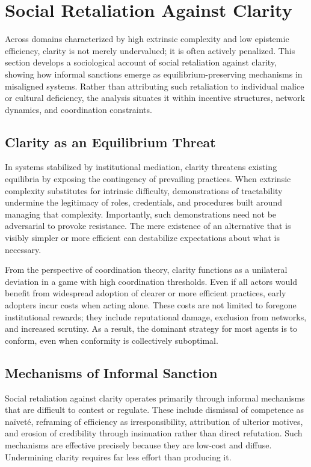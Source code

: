 \documentclass[11pt]{article}
\begin{document}
\section{Social Retaliation Against Clarity}

Across domains characterized by high extrinsic complexity and low epistemic efficiency, clarity is not merely undervalued; it is often actively penalized. This section develops a sociological account of social retaliation against clarity, showing how informal sanctions emerge as equilibrium-preserving mechanisms in misaligned systems. Rather than attributing such retaliation to individual malice or cultural deficiency, the analysis situates it within incentive structures, network dynamics, and coordination constraints.

\subsection{Clarity as an Equilibrium Threat}

In systems stabilized by institutional mediation, clarity threatens existing equilibria by exposing the contingency of prevailing practices. When extrinsic complexity substitutes for intrinsic difficulty, demonstrations of tractability undermine the legitimacy of roles, credentials, and procedures built around managing that complexity. Importantly, such demonstrations need not be adversarial to provoke resistance. The mere existence of an alternative that is visibly simpler or more efficient can destabilize expectations about what is necessary.

From the perspective of coordination theory, clarity functions as a unilateral deviation in a game with high coordination thresholds. Even if all actors would benefit from widespread adoption of clearer or more efficient practices, early adopters incur costs when acting alone. These costs are not limited to foregone institutional rewards; they include reputational damage, exclusion from networks, and increased scrutiny. As a result, the dominant strategy for most agents is to conform, even when conformity is collectively suboptimal.

\subsection{Mechanisms of Informal Sanction}

Social retaliation against clarity operates primarily through informal mechanisms that are difficult to contest or regulate. These include dismissal of competence as naïveté, reframing of efficiency as irresponsibility, attribution of ulterior motives, and erosion of credibility through insinuation rather than direct refutation. Such mechanisms are effective precisely because they are low-cost and diffuse. Undermining clarity requires far less effort than producing it.
\end{document}
